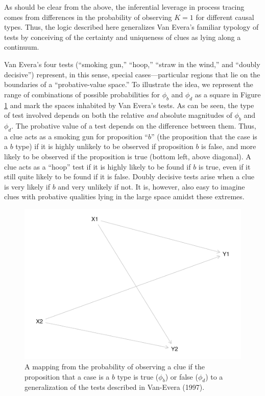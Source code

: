 \documentclass[12pt,]{book}
\begin{document}
As should be clear from the above, the inferential leverage in process tracing comes from differences in the probability of observing \(K=1\) for different causal types. Thus, the logic described here generalizes Van Evera's familiar typology of tests by conceiving of the certainty and uniqueness of clues as lying along a continuum.

Van Evera's four tests (``smoking gun,'' ``hoop,'' ``straw in the wind,'' and ``doubly decisive'') represent, in this sense, special cases---particular regions that lie on the boundaries of a ``probative-value space.'' To illustrate the idea, we represent the range of combinations of possible probabilities for \(\phi_b\) and \(\phi_d\) as a square in Figure \ref{CluesInferences1} and mark the spaces inhabited by Van Evera's tests. As can be seen, the type of test involved depends on both the relative \emph{and} absolute magnitudes of \(\phi_b\) and \(\phi_d\). The probative value of a test depends on the difference between them. Thus, a clue acts as a smoking gun for proposition ``\(b\)'' (the proposition that the case is a \(b\) type) if it is highly unlikely to be observed if proposition \(b\) is false, and more likely to be observed if the proposition is true (bottom left, above diagonal). A clue acts as a ``hoop'' test if it is highly likely to be found if \(b\) is true, even if it still quite likely to be found if it is false. Doubly decisive tests arise when a clue is very likely if \(b\) and very unlikely if not. It is, however, also easy to imagine clues with probative qualities lying in the large space amidst these extremes.

\begin{figure}
\centering
\includegraphics{ii_files/figure-latex/unnamed-chunk-23-1.pdf}
\caption{\label{fig:unnamed-chunk-23}\label{CluesInferences1} A mapping from the probability of observing a clue if the proposition that a case is a \(b\) type is true (\(\phi_b\)) or false (\(\phi_d\)) to a generalization of the tests described in Van-Evera (1997).}
\end{figure}
\end{document}
